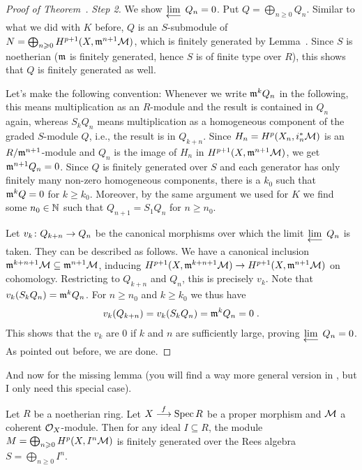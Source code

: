 \documentclass[a4paper,parskip=half,numbers=enddot, DIV=12]{scrreprt}
\renewcommand{\geq}{\geqslant}
\begin{document}
\begin{proof}[Proof of Theorem~]
	\emph{Step 2.} We show $\limit Q_n=0$. Put $Q=\bigoplus_{n\geq 0}Q_n$. Similar to what we did with $K$ before, $Q$ is an $S$-submodule of $N=\bigoplus_{n\geq 0}H^{p+1}(X,\mm^{n+1}\Mm)$, which is finitely generated by Lemma~. Since $S$ is noetherian ($\mathfrak{m}$ is finitely generated, hence $S$ is of finite type over $R$), this shows that $Q$ is finitely generated as well.
	
	Let's make the following convention: Whenever we write $\mathfrak{m}^kQ_n$ in the following, this means multiplication as an $R$-module and the result is contained in $Q_n$ again, whereas $S_kQ_n$ means multiplication as a homogeneous component of the graded $S$-module $Q$, i.e., the result is in $Q_{k+n}$. Since $H_n=H^p(X_n,i_n^*\mathcal{M})$ is an $R/\mathfrak{m}^{n+1}$-module and $Q_n$ is the image of $H_n$ in $H^{p+1}(X,\mathfrak{m}^{n+1}\mathcal{M})$, we get $\mathfrak{m}^{n+1}Q_n=0$. Since $Q$ is finitely generated over $S$ and each generator has only finitely many non-zero homogeneous components, there is a $k_0$ such that $\mathfrak{m}^kQ=0$ for $k\geq k_0$. Moreover, by the same argument we used for $K$ we find some $n_0\in\mathbb{N}$ such that $Q_{n+1}=S_1Q_n$ for $n\geq n_0$.
	
	Let $v_k\colon Q_{k+n}\morphism Q_n$ be the canonical morphisms over which the limit $\limit Q_n$ is taken. They can be described as follows. We have a canonical inclusion $\mathfrak{m}^{k+n+1}\mathcal{M}\subseteq \mathfrak{m}^{n+1}\mathcal{M}$, inducing $H^{p+1}(X,\mm^{k+n+1}\Mm)\morphism H^{p+1}(X,\mm^{n+1}\Mm)$ on cohomology. Restricting to $Q_{k+n}$ and $Q_n$, this is precisely $v_k$. Note that $v_k(S_kQ_n)=\mathfrak{m}^kQ_n$. For $n\geq n_0$ and $k\geq k_0$ we thus have
	\begin{align*}
		v_k(Q_{k+n})=v_k(S_kQ_n)=\mathfrak{m}^kQ_n=0\;.
	\end{align*}
	This shows that the $v_k$ are $0$ if $k$ and $n$ are sufficiently large, proving $\limit Q_n=0$. As pointed out before, we are done.
\end{proof}
And now for the missing lemma (you will find a way more general version in \cite[(2.4.1)]{egaIII}, but I only need this special case).
\begin{lem}
	Let $R$ be a noetherian ring. Let $X\morphism[f]\Spec R$ be a proper morphism and $\mathcal{M}$ a coherent $\mathcal{O}_X$-module. Then for any ideal $I\subseteq R$, the module $M=\bigoplus_{n\geq 0}H^p(X,I^n\Mm)$ is finitely generated over the Rees algebra $S=\bigoplus_{n\geq 0}I^n$.
\end{lem}
\end{document}

